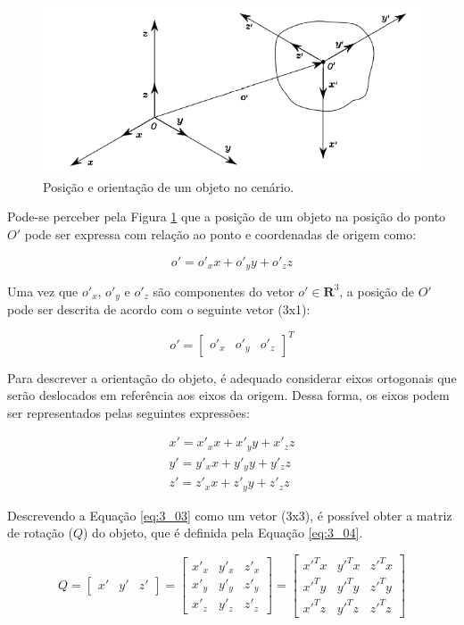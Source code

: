 \begin{figure}[h!]
\centering
\includegraphics[width=0.7\columnwidth]{Imagens/PosEOri.PNG}
\caption{Posição e orientação de um objeto no cenário. \cite{siciliano2010robotics}}
\label{fig:PoseOri}
\end{figure}

Pode-se perceber pela Figura \ref{fig:PoseOri} que a posição de um objeto na posição do ponto $O'$ pode ser expressa com relação ao ponto e coordenadas de origem como:

\begin{equation}
o' = o'_xx+o'_yy+o'_zz
\label{eq:3_01}
\end{equation}

Uma vez que $o'_x$, $o'_y$ e $o'_z$ são componentes do vetor $o'\in \mathbf{R}^3$, a posição de $O'$ pode ser descrita de acordo com o seguinte vetor (3x1):

\begin{equation}
o' = 
\begin{bmatrix}
o'_x & o'_y & o'_z
\end{bmatrix} ^T
\label{eq:3_02}
\end{equation}

Para descrever a orientação do objeto, é adequado considerar eixos ortogonais que serão deslocados em referência aos eixos da origem. Dessa forma, os eixos podem ser representados pelas seguintes expressões:

\begin{equation}
\begin{matrix}
x' = x'_xx+x'_yy+x'_zz\\
y' = y'_xx+y'_yy+y'_zz\\
z' = z'_xx+z'_yy+z'_zz
\end{matrix}
\label{eq:3_03}
\end{equation}

Descrevendo a Equação \ref{eq:3_03} como um vetor (3x3), é possível obter a matriz de rotação ($Q$) do objeto, que é definida pela Equação \ref{eq:3_04}.

\begin{equation}
Q = 
\begin{bmatrix}
x' & y' & z'
\end{bmatrix}  = 
\begin{bmatrix}
x'_x & y'_x & z'_x \\
x'_y & y'_y & z'_y \\
x'_z & y'_z & z'_z
\end{bmatrix}  = 
\begin{bmatrix}
x'^Tx & y'^Tx & z'^Tx \\
x'^Ty & y'^Ty & z'^Ty \\
x'^Tz & y'^Tz & z'^Tz
\end{bmatrix}
\label{eq:3_04}
\end{equation}

